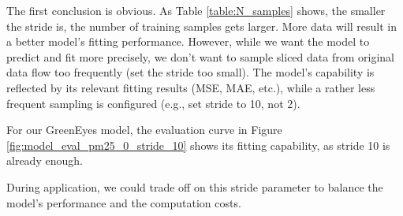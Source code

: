 The first conclusion is obvious. As Table \ref{table:N_samples} shows, the smaller the stride is, the number of training samples gets larger. More data will result in a better model's fitting performance. However, while we want the model to predict and fit more precisely, we don't want to sample sliced data from original data flow too frequently (set the stride too small). The model's capability is reflected by its relevant fitting results (MSE, MAE, etc.), while a rather less frequent sampling is configured (e.g., set stride to 10, not 2).

For our GreenEyes model, the evaluation curve in Figure \ref{fig:model_eval_pm25_0_stride_10} shows its fitting capability, as stride 10 is already enough.

During application, we could trade off on this stride parameter to balance the model's performance and the computation costs.
